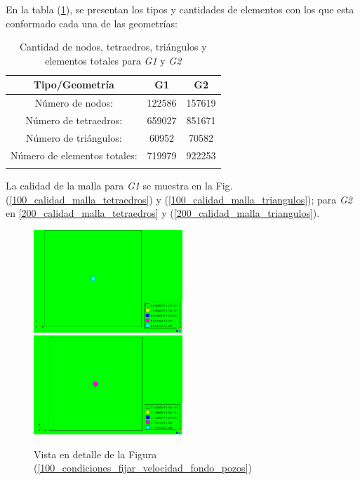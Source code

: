 \documentclass[10pt,a4paper,final]{article}
\begin{document}
En la tabla (\ref{tabla_lista_elementos}), se presentan los tipos y cantidades de elementos con los que esta conformado cada una de las geometrías:
%
\begin{table}[tbhp]
\begin{center}\begin{tabular}{ccc}
\hline \textbf{Tipo/Geometría} & \textbf{G1} & \textbf{G2} \\ 
\hline Número de nodos: & 122586 & 157619 \\ 
\hline Número de tetraedros: & 659027 & 851671\\ 
\hline Número de triángulos: & 60952  & 70582 \\ 
\hline Número de elementos totales: & 719979 & 922253 \\ 
\hline 
\label{tabla_lista_elementos}
\end{tabular}\end{center}
\caption{Cantidad de nodos, tetraedros, triángulos y elementos totales para \emph{G1} y \emph{G2}}
\end{table}
La calidad de la malla para \emph{G1} se muestra en la Fig. (\ref{100_calidad_malla_tetraedros}) y (\ref{100_calidad_malla_triangulos}); para \emph{G2} en \ref{200_calidad_malla_tetraedros} y (\ref{200_calidad_malla_triangulos}).

\begin{figure}[htbp] 
\centering 
\includegraphics[width=0.5\textwidth]{img/100m/100_condiciones_fijar_velocidad_fondo_pozos_arriba_izquierda} 
\includegraphics[width=0.5\textwidth]{img/100m/100_condiciones_fijar_velocidad_fondo_pozos_abajo_derecha}
\caption{Vista en detalle de la Figura (\ref{100_condiciones_fijar_velocidad_fondo_pozos})} 
\label{fondo_pozos_detalles} 
\end{figure} 
\end{document}
